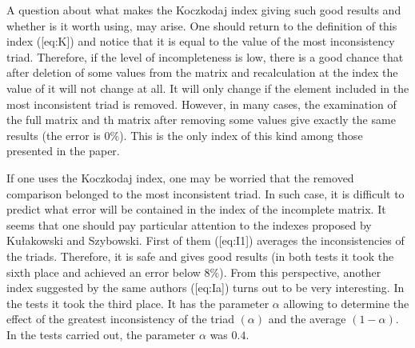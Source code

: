 A question about what makes the Koczkodaj index giving such good results and whether is it worth using, may arise. One should return to the definition of this index ([eq:K]) and notice that it is equal to the value of the most inconsistency triad. Therefore, if the level of incompleteness is low, there is a good chance that after deletion of some values from the matrix and recalculation at the index the value of it will not change at all. It will only change if the element included in the most inconsistent triad is removed. However, in many cases, the examination of the full matrix and th matrix after removing some values give exactly the same results (the error is $0\%$). This is the only index of this kind among those presented in the paper.

If one uses the Koczkodaj index, one may be worried that the removed comparison belonged to the most inconsistent triad. In such case, it is difficult to predict what error will be contained in the index of the incomplete matrix. It seems that one should pay particular attention to the indexes proposed by Kułakowski and Szybowski. First of them ([eq:I1]) averages the inconsistencies of the triads. Therefore, it is safe and gives good results (in both tests it took the sixth place and achieved an error below $8\%$). From this perspective, another index suggested by the same authors ([eq:Ia]) turns out to be very interesting. In the tests it took the third place. It has the parameter $\alpha$ allowing to determine the effect of the greatest inconsistency of the triad $\left(\alpha\right)$ and the average $\left(1-\alpha\right)$. In the tests carried out, the parameter $\alpha$ was $0.4$.
